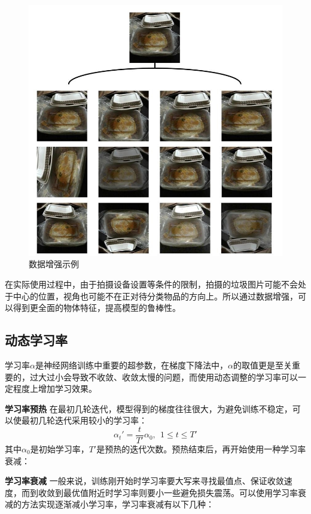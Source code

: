 \documentclass[a4paper]{article}
\begin{document}
\begin{CJK*}{UTF8}{gbsn}
\begin{figure}[h!]
\centering
\includegraphics[scale=0.4]{data-augment.jpg}
\caption{数据增强示例}
\label{fig:data_augment}
\end{figure}

在实际使用过程中，由于拍摄设备设置等条件的限制，拍摄的垃圾图片可能不会处于中心的位置，视角也可能不在正对待分类物品的方向上。所以通过数据增强，可以得到更全面的物体特征，提高模型的鲁棒性。

\subsection{动态学习率}

学习率$\alpha$是神经网络训练中重要的超参数，在梯度下降法中，$\alpha$的取值更是至关重要的，过大过小会导致不收敛、收敛太慢的问题，而使用动态调整的学习率可以一定程度上增加学习效果。

\textbf{学习率预热}  在最初几轮迭代，模型得到的梯度往往很大，为避免训练不稳定，可以使最初几轮迭代采用较小的学习率：$$\alpha_t'=\frac{t}{T'}\alpha_0,\ \ 1\leq t\leq T'$$
其中$\alpha_0$是初始学习率，$T'$是预热的迭代次数。预热结束后，再开始使用一种学习率衰减：

\textbf{学习率衰减}  一般来说，训练刚开始时学习率要大写来寻找最值点、保证收敛速度，而到收敛到最优值附近时学习率则要小一些避免损失震荡。可以使用学习率衰减的方法实现逐渐减小学习率，学习率衰减有以下几种：


\end{CJK*}
\end{document}
